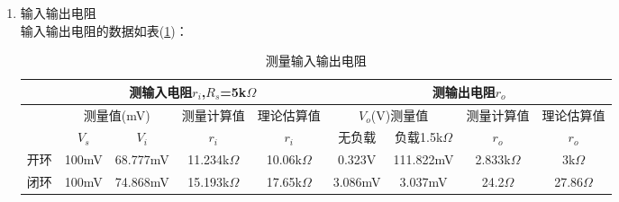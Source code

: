 \documentclass[a4paper]{article}
\begin{document}
\begin{enumerate}
验证负反馈放大电路对幅频特性的影响：\\
闭环后，放大电路的通频带得到了拓宽，闭环理论值应为开环时的$(1+A_VF_V)$或$\frac{1}{(1+A_VF_V)}$倍：
\begin{eqnarray}
f_{L\text{,闭环}} &=& \cfrac{f_L}{1+A_VF_V} \approx \cfrac{754}{35.9} \approx 21\text{Hz}\\
f_{H\text{,闭环}} &=& f_H\times (1+A_VF_V) \approx 240\times 35.9 \approx 8.6\text{MHz}
\end{eqnarray}
尽管具体数值与测量数据不是很相近，但是数量级大致正确，可以验证负反馈对幅频特性的影响。
\item 输入输出电阻\\
输入输出电阻的数据如表(\ref{rio})：
\begin{table}[!h]
\centering
\caption{测量输入输出电阻}
\label{rio}
\begin{tabular}{|c|c|c|c|c|c|c|c|c|}
\hline
   & \multicolumn{4}{c|}{测输入电阻$r_i$,$R_s$=5k$\Omega$}      & \multicolumn{4}{c|}{测输出电阻$r_o$}                  \\ \hline
   & \multicolumn{2}{c|}{测量值(mV)} & 测量计算值      & 理论估算值       & \multicolumn{2}{c|}{$V_o$(V)测量值} & 测量计算值 & 理论估算值 \\ \hline
   & $V_s$         & $V_i$        & $r_i$      & $r_i$     & 无负载       & 负载1.5k$\Omega$       & $r_o$ & $r_o$ \\ \hline
开环 & 100mV & 68.777mV & 11.234k$\Omega$ & 10.06k$\Omega$ & 0.323V & 111.822mV & 2.833k$\Omega$ & 3k$\Omega$ \\ \hline
闭环 & 100mV & 74.868mV & 15.193k$\Omega$ & 17.65k$\Omega$ & 3.086mV & 3.037mV & 24.2$\Omega$ & 27.86$\Omega$ \\ \hline
\end{tabular}
\end{table}


\end{enumerate}
\end{document}
